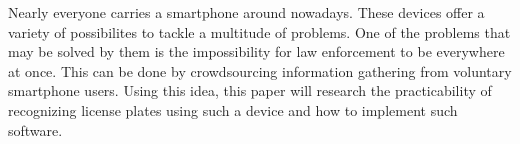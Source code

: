\samenvatting

Nearly everyone carries a smartphone around nowadays. These devices offer a variety of possibilites to tackle a multitude of problems. One of the problems that may be solved by them is the impossibility for law enforcement to be everywhere at once. This can be done by crowdsourcing information gathering from voluntary smartphone users. Using this idea, this paper will research the practicability of recognizing license plates using such a device and how to implement such software.

